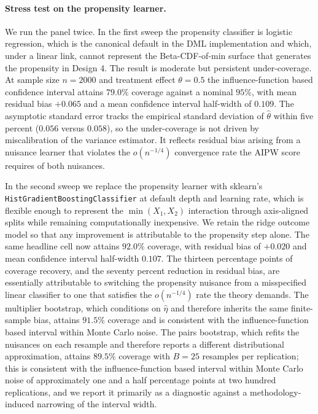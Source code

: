 \paragraph{Stress test on the propensity learner.} We run the panel
twice. In the first sweep the propensity classifier is logistic
regression, which is the canonical default in the
\citet{chernozhukov2018double} DML implementation and which, under a
linear link, cannot represent the Beta-CDF-of-min surface that
generates the propensity in Design 4. The result is moderate but
persistent under-coverage. At sample size $n=2000$ and treatment
effect $\theta=0.5$ the influence-function based confidence interval
attains $79.0\%$ coverage against a nominal $95\%$, with mean residual
bias $+0.065$ and a mean confidence interval half-width of $0.109$.
The asymptotic standard error tracks the empirical standard deviation
of $\hat{\theta}$ within five percent ($0.056$ versus $0.058$), so the
under-coverage is not driven by miscalibration of the variance
estimator. It reflects residual bias arising from a nuisance learner
that violates the $o(n^{-1/4})$ convergence rate the AIPW score
requires of both nuisances.

In the second sweep we replace the propensity learner with sklearn's
\texttt{HistGradientBoostingClassifier} at default depth and learning
rate, which is flexible enough to represent the
$\min(X_1, X_2)$ interaction through axis-aligned splits while
remaining computationally inexpensive.  We retain the ridge outcome
model so that any improvement is attributable to the propensity step
alone. The same headline cell now attains $92.0\%$ coverage, with
residual bias of $+0.020$ and mean confidence interval half-width
$0.107$.  The thirteen percentage points of coverage recovery, and
the seventy percent reduction in residual bias, are essentially
attributable to switching the propensity nuisance from a misspecified
linear classifier to one that satisfies the $o(n^{-1/4})$ rate the
theory demands.  The multiplier bootstrap, which conditions on
$\hat\eta$ and therefore inherits the same finite-sample bias, attains
$91.5\%$ coverage and is consistent with the influence-function based
interval within Monte Carlo noise.  The pairs bootstrap, which refits
the nuisances on each resample and therefore reports a different
distributional approximation, attains $89.5\%$ coverage with $B{=}25$
resamples per replication; this is consistent with the
influence-function based interval within Monte Carlo noise of
approximately one and a half percentage points at two hundred
replications, and we report it primarily as a diagnostic against a
methodology-induced narrowing of the interval width.

